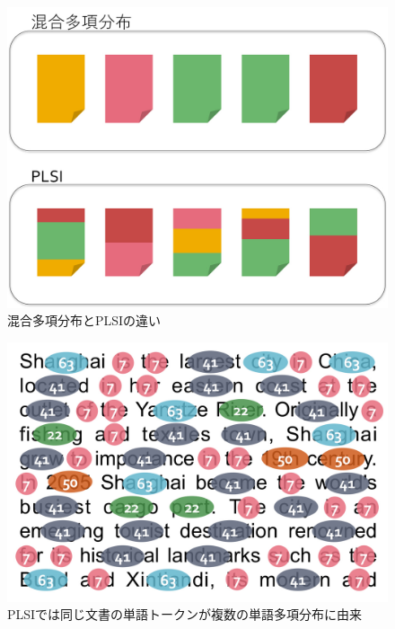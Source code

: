 \documentclass[aspectratio=169,unicode,dvipdfmx,14pt]{beamer}
\begin{document}
\begin{frame}
\begin{figure}[htbp]
\begin{center}
\includegraphics[scale=.21]{PLSI1.jpg}
\caption{混合多項分布とPLSIの違い}
\label{}
\end{center}
\end{figure}\end{frame}

\begin{frame}
\begin{figure}[htbp]
\begin{center}
\includegraphics[scale=.22]{PLSI2.jpg}
\vspace{-.2in}
\caption{PLSIでは同じ文書の単語トークンが複数の単語多項分布に由来}
\label{}
\end{center}
\end{figure}
\end{frame}
\end{document}
